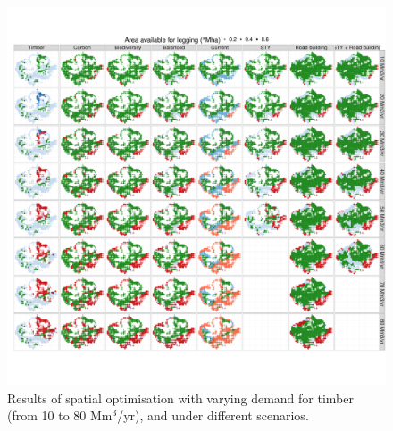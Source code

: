 \documentclass[12pt]{article}
\begin{document}
\clearpage

\begin{figure}
    \centering
    \includegraphics[width=\linewidth]{graphs/mapsChangeDemand.pdf}
    \caption{Results of spatial optimisation with varying demand for timber (from 10 to 80 Mm$^3$/yr), and under different scenarios.}
    \label{fig:mapsIncDemand}
\end{figure}
\end{document}
